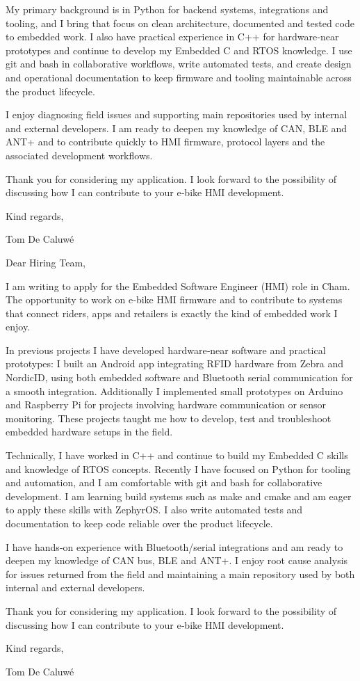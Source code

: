 \documentclass[12pt,a4paper]{letter}
\begin{document}
My primary background is in Python for backend systems, integrations and tooling, and I bring that focus on clean architecture, documented and tested code to embedded work. I also have practical experience in C++ for hardware‑near prototypes and continue to develop my Embedded C and RTOS knowledge. I use git and bash in collaborative workflows, write automated tests, and create design and operational documentation to keep firmware and tooling maintainable across the product lifecycle.

I enjoy diagnosing field issues and supporting main repositories used by internal and external developers. I am ready to deepen my knowledge of CAN, BLE and ANT+ and to contribute quickly to HMI firmware, protocol layers and the associated development workflows.

Thank you for considering my application. I look forward to the possibility of discussing how I can contribute to your e‑bike HMI development.

Kind regards,

Tom De Caluwé


Dear Hiring Team,

I am writing to apply for the Embedded Software Engineer (HMI) role in Cham. The opportunity to work on e‑bike HMI firmware and to contribute to systems that connect riders, apps and retailers is exactly the kind of embedded work I enjoy.

In previous projects I have developed hardware‑near software and practical prototypes: I built an Android app integrating RFID hardware from Zebra and NordicID, using both embedded software and Bluetooth serial communication for a smooth integration. Additionally I implemented small prototypes on Arduino and Raspberry Pi for projects involving hardware communication or sensor monitoring. These projects taught me how to develop, test and troubleshoot embedded hardware setups in the field.

Technically, I have worked in C++ and continue to build my Embedded C skills and knowledge of RTOS concepts. Recently I have focused on Python for tooling and automation, and I am comfortable with git and bash for collaborative development. I am learning build systems such as make and cmake and am eager to apply these skills with ZephyrOS. I also write automated tests and documentation to keep code reliable over the product lifecycle.

I have hands‑on experience with Bluetooth/serial integrations and am ready to deepen my knowledge of CAN bus, BLE and ANT+. I enjoy root cause analysis for issues returned from the field and maintaining a main repository used by both internal and external developers.

Thank you for considering my application. I look forward to the possibility of discussing how I can contribute to your e‑bike HMI development.

Kind regards,

Tom De Caluwé
\end{document}
